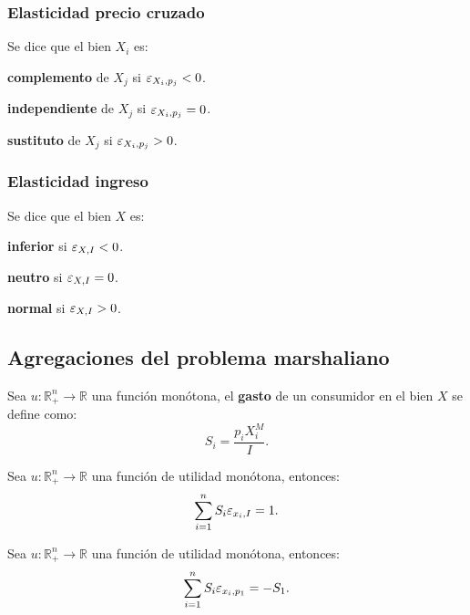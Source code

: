 \documentclass[8pt,a4paper]{extarticle}
\begin{document}
\begin{multicols}{3}
	\subsubsection*{Elasticidad precio cruzado}

	Se dice que el bien $X_i$ es:

	\begin{eqlist}
		\item \textbf{complemento} de $X_j$ si $\E_{X_i, p_j} < 0$.
		\item \textbf{independiente} de $X_j$ si $\E_{X_i, p_j} = 0$.
		\item \textbf{sustituto} de $X_j$ si $\E_{X_i, p_j} > 0$.
	\end{eqlist}

	\subsubsection*{Elasticidad ingreso}

	Se dice que el bien $X$ es:

	\begin{eqlist}
		\item \textbf{inferior} si $\E_{X, I} < 0$.
		\item \textbf{neutro} si $\E_{X, I} = 0$.
		\item \textbf{normal} si $\E_{X, I} > 0$.
	\end{eqlist}

	\subsection{Agregaciones del problema marshaliano}

	\begin{boxdef}
		Sea $u : \mathbb{R}^n_+ \to \mathbb{R}$ una función monótona, el \textbf{gasto} de un consumidor en el bien $X$ se define como:
		\[
			S_i = \frac{p_i X_i^M}{I}
			.\]
	\end{boxdef}

	\begin{boxtheo}
		Sea $u : \mathbb{R}^n_+ \to \mathbb{R}$ una función de utilidad monótona, entonces:
		\[
			\sum_{i = 1}^{n} S_{{i}} \E_{x_i, I} = 1
			.\]
	\end{boxtheo}

	\begin{boxtheo}
		Sea $u : \mathbb{R}^n_+ \to \mathbb{R}$ una función de utilidad monótona, entonces:
		\[
			\sum_{i = 1}^{n} S_{i} \E_{x_i, p_{1}} = - S_{1}
			.\]
	\end{boxtheo}


\end{multicols}
\end{document}
